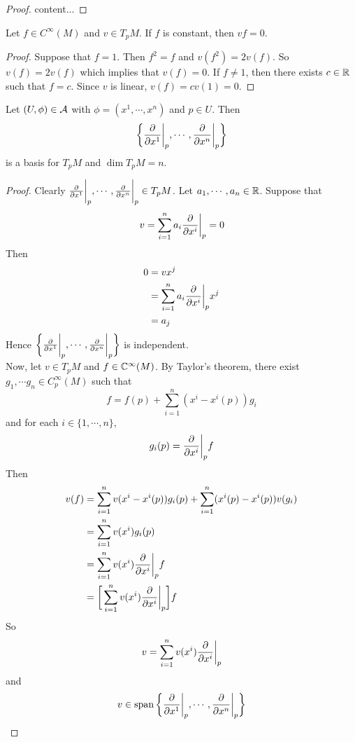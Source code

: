 \documentclass{book}
\begin{document}
	\begin{proof}
		content...
	\end{proof}

	\begin{ex}
		Let $f \in C^{\infty}(M)$ and $v \in T_pM$. If $f$ is constant, then $vf = 0$.
	\end{ex}

	\begin{proof}
		Suppose that $f = 1$. Then $f^2 = f$ and $v(f^2) = 2v(f)$. So $v(f) = 2v(f)$ which implies that $v(f) = 0$. If $f \neq 1$, then there exists $c \in \mathbb{R}$ such that $f = c$. Since $v$ is linear, $v(f) = cv(1) = 0$.
	\end{proof}

	\begin{ex}
		Let $(U, \phi) \in \mathcal{A}$ with $\phi = (x^1, \cdots, x^n)$ and $p \in U$. Then $$ \bigg \{\frac{\partial}{\partial x^1} \bigg|_p, \cdots, \frac{\partial}{\partial x^n} \bigg|_p \bigg \}$$ is a basis for $T_pM$ and $\dim T_pM = n$.
	\end{ex}

	\begin{proof}
		Clearly $\frac{\partial}{\partial x^1} \bigg|_p, \cdots, \frac{\partial}{\partial x^n} \bigg|_p \in T_pM$. Let $a_1, \cdots, a_n \in \mathbb{R}$. Suppose that $$v = \sum_{i=1}^n a_i \frac{\partial}{\partial x^i} \bigg |_p  = 0$$
		Then 
		\begin{align*}
			0
			&= v x^j \\
			&= \sum_{i=1}^n a_i \frac{\partial}{\partial x^i} \bigg |_p  x^j \\
			&= a_j
		\end{align*}
		Hence $\bigg \{\frac{\partial}{\partial x^1} \bigg|_p, \cdots, \frac{\partial}{\partial x^n} \bigg|_p \bigg \}$ is independent.\\
		Now, let $v \in T_pM$ and $f \in \mathbb{C}^{\infty}(M)$. By Taylor's theorem, there exist $g_1, \cdots g_n \in C_p^{\infty}(M)$ such that $$f = f(p) + \sum_{i=1}^n(x^i - x^i(p)) g_i$$ and for each $i \in \{1, \cdots, n\}$, $$g_i(p) = \frac{\partial}{\partial x^i} \bigg |_p  f $$ Then 
		\begin{align*}
			v(f)
			&= \sum_{i=1}^nv(x^i - x^i(p)) g_i(p) + \sum_{i=1}^n(x^i(p) - x^i(p)) v(g_i) \\
			&= \sum_{i=1}^nv(x^i)g_i(p) \\
			&= \sum_{i=1}^nv(x^i)\frac{\partial}{\partial x^i} \bigg |_p  f \\
			&= \bigg[ \sum_{i=1}^nv(x^i)\frac{\partial}{\partial x^i} \bigg |_p  \bigg] f
		\end{align*}
		So $$v = \sum_{i=1}^nv(x^i)\frac{\partial}{\partial x^i} \bigg |_p  $$ and $$v \in \operatorname{span} \bigg \{\frac{\partial}{\partial x^1} \bigg|_p, \cdots, \frac{\partial}{\partial x^n} \bigg|_p \bigg \}$$
	\end{proof}
\end{document}
